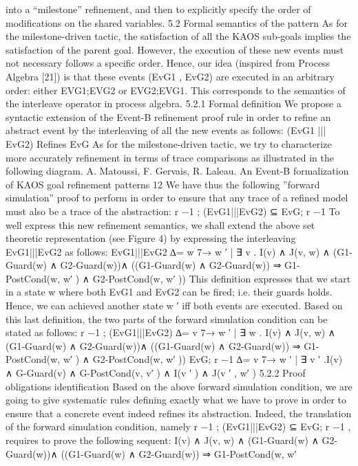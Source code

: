 into a “milestone” refinement, and then to explicitly specify the order of modifications on
the shared variables.
5.2 Formal semantics of the pattern
As for the milestone-driven tactic, the satisfaction of all the KAOS sub-goals implies the
satisfaction of the parent goal. However, the execution of these new events must not necessary follows a specific order. Hence, our idea (inspired from Process Algebra [21]) is that
these events (EvG1 , EvG2) are executed in an arbitrary order: either EVG1;EVG2
or EVG2;EVG1. This corresponds to the semantics of the interleave operator in process
algebra.
5.2.1 Formal definition
We propose a syntactic extension of the Event-B refinement proof rule in order to refine an
abstract event by the interleaving of all the new events as follows:
(EvG1 ||| EvG2) Refines EvG
As for the milestone-driven tactic, we try to characterize more accurately refinement in
terms of trace comparisons as illustrated in the following diagram.
A. Matoussi, F. Gervais, R. Laleau. An Event-B formalization of KAOS goal refinement patterns 12
We have thus the following ”forward simulation” proof to perform in order to ensure that
any trace of a refined model must also be a trace of the abstraction:
r
−1
; (EvG1|||EvG2) ⊆ EvG; r
−1
To well express this new refinement semantics, we shall extend the above set theoretic
representation (see Figure 4) by expressing the interleaving EvG1|||EvG2 as follows:
EvG1|||EvG2
∆= {w 7→ w
′
| ∃ v . I(v) ∧ J(v, w) ∧ (G1-Guard(w) ∧ G2-Guard(w))∧
((G1-Guard(w) ∧ G2-Guard(w)) ⇒ G1-PostCond(w, w′
) ∧ G2-PostCond(w, w′
))}
This definition expresses that we start in a state w where both EvG1 and EvG2 can be
fired; i.e. their guards holds. Hence, we can achieved another state w
′
iff both events are
executed. Based on this last definition, the two parts of the forward simulation condition can
be stated as follows:
r
−1
; (EvG1|||EvG2) ∆= {v 7→ w
′
| ∃ w . I(v) ∧ J(v, w) ∧ (G1-Guard(w) ∧ G2-Guard(w))∧
((G1-Guard(w) ∧ G2-Guard(w)) ⇒ G1-PostCond(w, w′
) ∧ G2-PostCond(w, w′
))}
EvG; r
−1 ∆= {v 7→ w
′
| ∃ v
′
.I(v) ∧ G-Guard(v) ∧ G-PostCond(v, v′
) ∧ I(v
′
) ∧ J(v
′
, w′
) }
5.2.2 Proof obligations identification
Based on the above forward simulation condition, we are going to give systematic rules
defining exactly what we have to prove in order to ensure that a concrete event indeed
refines its abstraction. Indeed, the translation of the forward simulation condition, namely
r
−1
; (EvG1|||EvG2) ⊆ EvG; r
−1
, requires to prove the following sequent:
I(v) ∧ J(v, w) ∧ (G1-Guard(w) ∧ G2-Guard(w))∧
((G1-Guard(w) ∧ G2-Guard(w)) ⇒ G1-PostCond(w, w′

